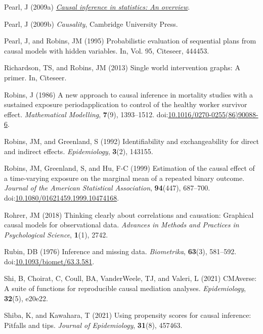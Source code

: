 \documentclass[
  singlecolumn,
  9pt]{article}
\begin{document}
\begin{CSLReferences}
Pearl, J (2009a) \emph{\href{https://doi.org/10.1214/09-SS057}{Causal
inference in statistics: An overview}}.

Pearl, J (2009b) \emph{Causality}, Cambridge University Press.

Pearl, J, and Robins, JM (1995) Probabilistic evaluation of sequential
plans from causal models with hidden variables. In, Vol. 95, Citeseer,
444453.

Richardson, TS, and Robins, JM (2013) Single world intervention graphs:
A primer. In, Citeseer.

Robins, J (1986) A new approach to causal inference in mortality studies
with a sustained exposure period{\textemdash}application to control of
the healthy worker survivor effect. \emph{Mathematical Modelling},
\textbf{7}(9), 1393--1512.
doi:\href{https://doi.org/10.1016/0270-0255(86)90088-6}{10.1016/0270-0255(86)90088-6}.

Robins, JM, and Greenland, S (1992) Identifiability and exchangeability
for direct and indirect effects. \emph{Epidemiology}, \textbf{3}(2),
143155.

Robins, JM, Greenland, S, and Hu, F-C (1999) Estimation of the causal
effect of a time-varying exposure on the marginal mean of a repeated
binary outcome. \emph{Journal of the American Statistical Association},
\textbf{94}(447), 687--700.
doi:\href{https://doi.org/10.1080/01621459.1999.10474168}{10.1080/01621459.1999.10474168}.

Rohrer, JM (2018) Thinking clearly about correlations and causation:
Graphical causal models for observational data. \emph{Advances in
Methods and Practices in Psychological Science}, \textbf{1}(1), 2742.

Rubin, DB (1976) Inference and missing data. \emph{Biometrika},
\textbf{63}(3), 581--592.
doi:\href{https://doi.org/10.1093/biomet/63.3.581}{10.1093/biomet/63.3.581}.

Shi, B, Choirat, C, Coull, BA, VanderWeele, TJ, and Valeri, L (2021)
CMAverse: A suite of functions for reproducible causal mediation
analyses. \emph{Epidemiology}, \textbf{32}(5), e20e22.

Shiba, K, and Kawahara, T (2021) Using propensity scores for causal
inference: Pitfalls and tips. \emph{Journal of Epidemiology},
\textbf{31}(8), 457463.


\end{CSLReferences}
\end{document}
